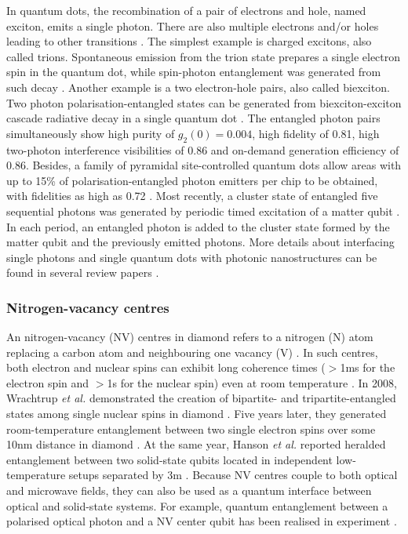 \documentclass[aps, rmp, twocolumn, amsmath, amssymb, nofootinbib, superscriptaddress, longbibliography, floatfix, table-of-contents, eqsecnum]{revtex4-1}
\begin{document}
In quantum dots, the recombination of a pair of electrons and hole, named exciton, emits a single photon. There are also multiple electrons and/or holes leading to other transitions \cite{lodahl2015interfacing}. The simplest example is charged excitons, also called trions. Spontaneous emission from the trion state prepares a single electron spin in the quantum dot, while spin-photon entanglement was generated from such decay \cite{de2012quantum, gao2012observation}. Another example is a two electron-hole pairs, also called biexciton. Two photon polarisation-entangled states can be generated from biexciton-exciton cascade radiative decay in a single quantum dot \cite{muller2014demand}. The entangled photon pairs simultaneously show high purity of \mbox{$g_2(0) = 0.004$}, high fidelity of 0.81, high two-photon interference visibilities of 0.86 and on-demand generation efficiency of 0.86. Besides, a family of pyramidal site-controlled quantum dots allow areas with up to 15\% of polarisation-entangled photon emitters per chip to be obtained, with fidelities as high as 0.72 \cite{juska2013towards, mohan2010polarization}. Most recently, a cluster state of entangled five sequential photons was generated by periodic timed excitation of a matter qubit \cite{schwartz2016deterministic}. In each period, an entangled photon is added to the cluster state formed by the matter qubit and the previously emitted photons. More details about interfacing single photons and single quantum dots with photonic nanostructures can be found in several review papers \cite{de2013ultrafast, urbaszek2013nuclear, lodahl2015interfacing}.

%
%

\subsubsection{Nitrogen-vacancy centres} 

An nitrogen-vacancy (NV) centres in diamond refers to a nitrogen (N) atom replacing a carbon atom and neighbouring one vacancy (V) \cite{doherty2013nitrogen}. In such centres, both electron and nuclear spins can exhibit long coherence times ($>$1ms for the electron spin and $>$1s for the nuclear spin) even at room temperature \cite{balasubramanian2009ultralong, neumann2010quantum, maurer2012room}. In 2008, Wrachtrup \textit{et al.} demonstrated the creation of bipartite- and tripartite-entangled states among single nuclear spins in diamond \cite{neumann2008multipartite}. Five years later, they generated room-temperature entanglement between two single electron spins over some 10nm distance in diamond \cite{dolde2013room}. At the same year, Hanson \textit{et al.} reported heralded entanglement between two solid-state qubits located in independent low-temperature setups separated by 3m \cite{bernien2013heralded}. Because NV centres couple to both optical and microwave fields, they can also be used as a quantum interface between optical and solid-state systems. For example, quantum entanglement between a polarised optical photon and a NV center qubit has been realised in experiment \cite{togan2010quantum}.
\end{document}

